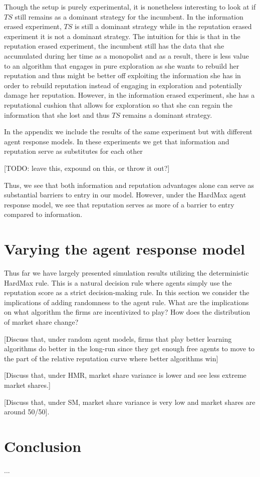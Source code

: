 \documentclass{article}
\theoremstyle{definition}
\begin{document}
Though the setup is purely experimental, it is nonetheless interesting to look at if $TS$ still remains as a dominant strategy for the incumbent. In the information erased experiment, $TS$ is still a dominant strategy while in the reputation erased experiment it is not a dominant strategy. The intuition for this is that in the reputation erased experiment, the incumbent still has the data that she accumulated during her time as a monopolist and as a result, there is less value to an algorithm that engages in pure exploration as she wants to rebuild her reputation and thus might be better off exploiting the information she has in order to rebuild reputation instead of engaging in exploration and potentially damage her reputation. However, in the information erased experiment, she has a reputational cushion that allows for exploration so that she can regain the information that she lost and thus $TS$ remains a dominant strategy.

In the appendix we include the results of the same experiment but with different agent response models. In these experiments we get that information and reputation serve as substitutes for each other

[TODO: leave this, expound on this, or throw it out?]

Thus, we see that both information and reputation advantages alone can serve as substantial barriers to entry in our model. However, under the HardMax agent response model, we see that reputation serves as more of a barrier to entry compared to information.

\section{Varying the agent response model}
\label{S:9}

Thus far we have largely presented simulation results utilizing the deterministic HardMax rule. This is a natural decision rule where agents simply use the reputation score as a strict decision-making rule. In this section we consider the implications of adding randomness to the agent rule. What are the implications on what algorithm the firms are incentivized to play? How does the distribution of market share change?

[Discuss that, under random agent models, firms that play better learning algorithms do better in the long-run since they get enough free agents to move to the part of the relative reputation curve where better algorithms win]

[Discuss that, under HMR, market share variance is lower and see less extreme market shares.]

[Discuss that, under SM, market share variance is very low and market shares are around 50/50].

\section{Conclusion}
\label{S:10}

...

\pagebreak

\end{document}
